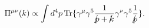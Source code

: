 \begin{equation}
\Pi^{\mu\nu}(k) \propto \int d^4p \, {\rm Tr}\{\gamma^\mu\gamma^5
{1 \over {{p\kern-0.15em\raise0.17ex\llap{/}\kern0.15em\relax} +
{k\kern-0.15em\raise0.17ex\llap{/}\kern0.15em\relax}}}
\gamma^\nu\gamma^5 {1\over
{{p\kern-0.15em\raise0.17ex\llap{/}\kern0.15em\relax}}}\}.
\end{equation}

